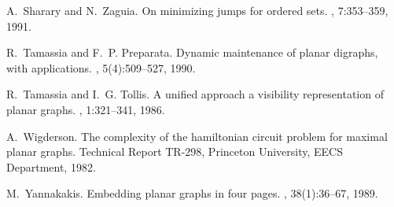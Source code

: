 \documentclass{myllncs-mixalis}
\begin{document}
\begin{thebibliography}{10}
A.~Sharary and N.~Zaguia.
\newblock On minimizing jumps for ordered sets.
, 7:353--359, 1991.

R.~Tamassia and F.~P. Preparata.
\newblock Dynamic maintenance of planar digraphs, with applications.
, 5(4):509--527, 1990.

R.~Tamassia and I.~G. Tollis.
\newblock A unified approach a visibility representation of planar graphs.
, 1:321--341, 1986.

A.~Wigderson.
\newblock The complexity of the hamiltonian circuit problem for maximal planar
  graphs.
\newblock Technical Report TR-298, Princeton University, EECS Department, 1982.

M.~Yannakakis.
\newblock Embedding planar graphs in four pages.
, 38(1):36--67, 1989.

\end{thebibliography}
\end{document}
